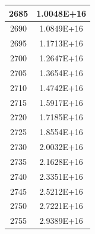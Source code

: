 \documentclass[a4paper]{article}
\begin{document}
\begin{tabular}{| c | c |}
    	2685 & 1.0048E+16 \\\hline
    	2690 & 1.0849E+16 \\\hline
    	2695 & 1.1713E+16 \\\hline
    	2700 & 1.2647E+16 \\\hline
    	2705 & 1.3654E+16 \\\hline
    	2710 & 1.4742E+16 \\\hline
    	2715 & 1.5917E+16 \\\hline
    	2720 & 1.7185E+16 \\\hline
    	2725 & 1.8554E+16 \\\hline
    	2730 & 2.0032E+16 \\\hline
    	2735 & 2.1628E+16 \\\hline
    	2740 & 2.3351E+16 \\\hline
    	2745 & 2.5212E+16 \\\hline
    	2750 & 2.7221E+16 \\\hline
    	2755 & 2.9389E+16 \\\hline
    \end{tabular}
    \hfill
\end{document}
